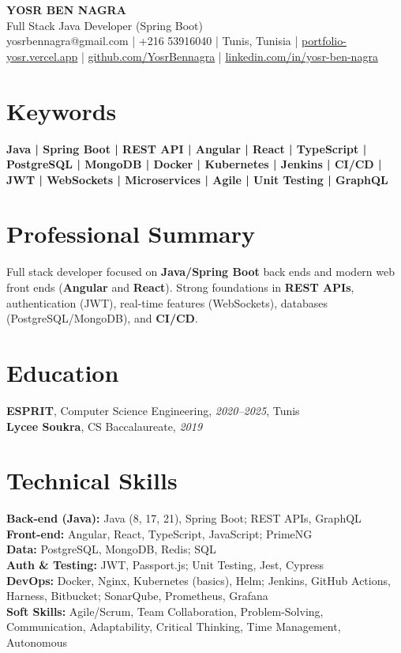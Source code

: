 \documentclass[10pt,a4paper]{article}
\begin{document}
\begin{center}
  {\Large\bfseries YOSR BEN NAGRA}\\[2pt]
  {\small Full Stack Java Developer (Spring Boot)}\\[3pt]
  {\footnotesize yosrbennagra@gmail.com \;|\; +216 53916040 \;|\; Tunis, Tunisia \;|\; \href{https://portfolio-yosr.vercel.app/en}{portfolio-yosr.vercel.app} \;|\; \href{https://github.com/YosrBennagra}{github.com/YosrBennagra} \;|\; \href{https://www.linkedin.com/in/yosr-ben-nagra/}{linkedin.com/in/yosr-ben-nagra}}
\end{center}

\section*{Keywords}
{\small\textbf{
Java | Spring Boot | REST API | Angular | React | TypeScript | PostgreSQL | MongoDB | Docker | Kubernetes | Jenkins | CI/CD | JWT | WebSockets | Microservices | Agile | Unit Testing | GraphQL
}}

\vspace{4pt}

\section*{Professional Summary}
{\small
Full stack developer focused on \textbf{Java/Spring Boot} back ends and modern web front ends (\textbf{Angular} and \textbf{React}). Strong foundations in \textbf{REST APIs}, authentication (JWT), real-time features (WebSockets), databases (PostgreSQL/MongoDB), and \textbf{CI/CD}.
}

\vspace{4pt}

\section*{Education}
{\small
\textbf{ESPRIT}, Computer Science Engineering, \textit{2020--2025}, Tunis\\[1pt]
\textbf{Lycee Soukra}, CS Baccalaureate, \textit{2019}
}

\vspace{4pt}

\section*{Technical Skills}
{\small
\textbf{Back-end (Java):} Java (8, 17, 21), Spring Boot; REST APIs, GraphQL\\[2pt]
\textbf{Front-end:} Angular, React, TypeScript, JavaScript; PrimeNG\\[2pt]
\textbf{Data:} PostgreSQL, MongoDB, Redis; SQL\\[2pt]
\textbf{Auth \& Testing:} JWT, Passport.js; Unit Testing, Jest, Cypress\\[2pt]
\textbf{DevOps:} Docker, Nginx, Kubernetes (basics), Helm; Jenkins, GitHub Actions, Harness, Bitbucket; SonarQube, Prometheus, Grafana\\[2pt]
\textbf{Soft Skills:} Agile/Scrum, Team Collaboration, Problem-Solving, Communication, Adaptability, Critical Thinking, Time Management, Autonomous
}
\end{document}
